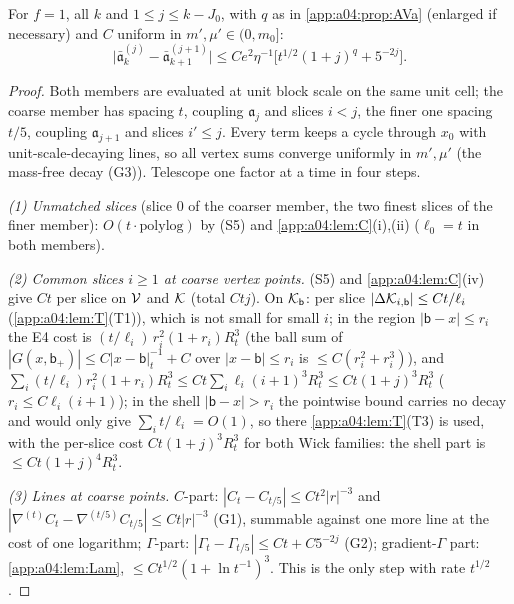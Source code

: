 \begin{proposition}\label{app:a04:prop:AVb}
For $f=1$, all $k$ and $1\le j\le k-J_0$, with $q$ as in \cref{app:a04:prop:AVa} (enlarged if necessary) and $C$ uniform in $m',\mu'\in(0,m_0]$:
\[
\big|\bar{\mathfrak a}^{(j)}_k-\bar{\mathfrak a}^{(j+1)}_{k+1}\big|\le Ce^2\eta^{-1}\big[t^{1/2}(1+j)^q+5^{-2j}\big].
\]
\end{proposition}
\begin{proof}
Both members are evaluated at unit block scale on the same unit cell; the coarse member has spacing $t$, coupling $\mathfrak a_j$ and slices $i<j$, the finer one spacing $t/5$, coupling $\mathfrak a_{j+1}$ and slices $i'\le j$. Every term keeps a cycle through $x_0$ with unit-scale-decaying lines, so all vertex sums converge uniformly in $m',\mu'$ (the mass-free decay (G3)). Telescope one factor at a time in four steps.

\emph{(1) Unmatched slices} (slice $0$ of the coarser member, the two finest slices of the finer member): $O(t\cdot\mathrm{polylog})$ by (S5) and \cref{app:a04:lem:C}(i),(ii) ($\ell_0=t$ in both members).

\emph{(2) Common slices $i\ge1$ at coarse vertex points.} (S5) and \cref{app:a04:lem:C}(iv) give $Ct$ per slice on $\mathcal V$ and $\mathcal K$ (total $Ctj$). On $\mathcal K_{\mathsf b}$: per slice $|\Delta\mathcal K_{i,\mathsf b}|\le Ct/\ell_i$ (\cref{app:a04:lem:T}(T1)), which is not small for small $i$; in the region $|\mathsf b-x|\le r_i$ the E4 cost is $(t/\ell_i)\,r_i^2(1+r_i)R_t^3$ (the ball sum of $|G(x,\mathsf b_+)|\le C|x-\mathsf b|_t^{-1}+C$ over $|x-\mathsf b|\le r_i$ is $\le C(r_i^2+r_i^3)$), and $\sum_i(t/\ell_i)r_i^2(1+r_i)R_t^3\le Ct\sum_i\ell_i(i+1)^3R_t^3\le Ct(1+j)^3R_t^3$ ($r_i\le C\ell_i(i+1)$); in the shell $|\mathsf b-x|>r_i$ the pointwise bound carries no decay and would only give $\sum_it/\ell_i=O(1)$, so there \cref{app:a04:lem:T}(T3) is used, with the per-slice cost $Ct(1+j)^3R_t^3$ for both Wick families: the shell part is $\le Ct(1+j)^4R_t^3$.

\emph{(3) Lines at coarse points.} $C$-part: $|C_t-C_{t/5}|\le Ct^2|r|^{-3}$ and $|\nabla^{(t)}C_t-\nabla^{(t/5)}C_{t/5}|\le Ct|r|^{-3}$ (G1), summable against one more line at the cost of one logarithm; $\Gamma$-part: $|\Gamma_t-\Gamma_{t/5}|\le Ct+C5^{-2j}$ (G2); gradient-$\Gamma$ part: \cref{app:a04:lem:Lam}, $\le Ct^{1/2}(1+\ln t^{-1})^3$. This is the only step with rate $t^{1/2}$.


\end{proof}
